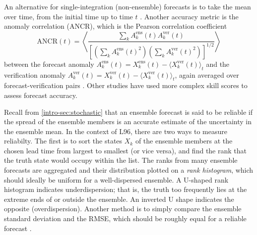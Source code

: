 \documentclass[../main.tex]{subfiles}
\begin{document}
An alternative for single-integration (non-ensemble) forecasts is to take the
mean over time, from the initial time up to time $t$ \parencite{bhouri2023}.
Another accuracy metric is the anomaly correlation (ANCR), which is the Pearson
correlation coefficient
\begin{equation*}
    \mathrm{ANCR}(t) = \left\langle
        \frac{
            \sum_k A_k^\text{ens}(t) A_k^\text{ver}(t)
        }{
            \left[
                \left( \sum_k A_k^\text{ens}(t)^2 \right)
                \left( \sum_k A_k^\text{ver}(t)^2 \right)
            \right]^{1/2}
        }
    \right\rangle
\end{equation*}
between the forecast anomaly $A_k^\text{ens}(t) = X_k^\text{ens}(t) - \langle
X_k^\text{ver}(t) \rangle_t$ and the verification anomaly $A_k^\text{ver}(t) =
X_k^\text{ver}(t) - \langle X_k^\text{ver}(t) \rangle_t$, again averaged over
forecast-verification pairs \parencite{crommelin2008}. Other studies
\parencite{kwasniok2012,arnold2013} have used more complex skill scores to
assess forecast accuracy.

Recall from \cref{intro-sec:stochastic} that an ensemble forecast is said to be
reliable if the spread of the ensemble members is an accurate estimate of the
uncertainty in the ensemble mean. In the context of L96, there are two ways to
measure reliabilty. The first \parencite{wilks2005,crommelin2008,kwasniok2012}
is to sort the states $X_k$ of the ensemble members at the chosen lead time
from largest to smallest (or vice versa), and find the rank that the truth
state would occupy within the list. The ranks from many ensemble forecasts are
aggregated and their distribution plotted on a \emph{rank histogram}, which
should ideally be uniform for a well-dispersed ensemble. A U-shaped rank
histogram indicates underdispersion; that is, the truth too frequently lies at
the extreme ends of or outside the ensemble. An inverted U shape indicates the
opposite (overdispersion). Another method is to simply compare the ensemble
standard deviation and the RMSE, which should be roughly equal for a reliable
forecast \parencite{arnold2013,gagne2020}.
\end{document}

